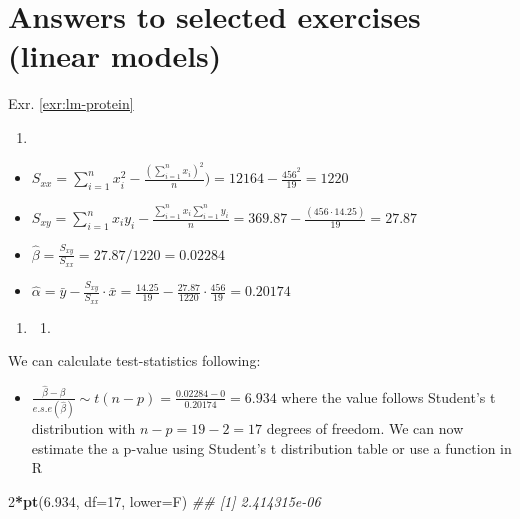 \documentclass[
]{book}
\newenvironment{Shaded}{\begin{snugshade}}{\end{snugshade}}
\newcommand{\CommentTok}[1]{\textcolor[rgb]{0.56,0.35,0.01}{\textit{#1}}}
\newcommand{\DataTypeTok}[1]{\textcolor[rgb]{0.13,0.29,0.53}{#1}}
\newcommand{\DecValTok}[1]{\textcolor[rgb]{0.00,0.00,0.81}{#1}}
\newcommand{\FloatTok}[1]{\textcolor[rgb]{0.00,0.00,0.81}{#1}}
\newcommand{\KeywordTok}[1]{\textcolor[rgb]{0.13,0.29,0.53}{\textbf{#1}}}
\newcommand{\NormalTok}[1]{#1}
\newcommand{\OperatorTok}[1]{\textcolor[rgb]{0.81,0.36,0.00}{\textbf{#1}}}
\providecommand{\tightlist}{%
  \setlength{\itemsep}{0pt}\setlength{\parskip}{0pt}}
\theoremstyle{definition}
\theoremstyle{definition}
\theoremstyle{definition}
\theoremstyle{remark}
\begin{document}
\hypertarget{answers-to-selected-exercises-linear-models}{%
\section*{Answers to selected exercises (linear models)}\label{answers-to-selected-exercises-linear-models}}

Exr. \ref{exr:lm-protein}

\begin{enumerate}
\def\labelenumi{\alph{enumi})}
\tightlist
\item
\end{enumerate}

\begin{itemize}
\tightlist
\item
  \(S_{xx} = \sum_{i=1}^{n}x_i^2-\frac{(\sum_{i=1}^{n}x_i)^2}{n}) = 12164 - \frac{456^2}{19} = 1220\)
\item
  \(S_{xy} = \sum_{i=1}^nx_iy_i-\frac{\sum_{i=1}^{n}x_i\sum_{i=1}^{n}y_i}{n} = 369.87 - \frac{(456 \cdot 14.25)}{19} = 27.87\)
\item
  \(\hat{\beta} = \frac{S_{xy}}{S_{xx}} = 27.87 / 1220 = 0.02284\)
\item
  \(\hat{\alpha} = \bar{y}-\frac{S_{xy}}{S_{xx}}\cdot \bar{x} = \frac{14.25}{19}-\frac{27.87}{1220}\cdot \frac{456}{19} = 0.20174\)
\end{itemize}

\begin{enumerate}
\def\labelenumi{\alph{enumi})}
\setcounter{enumi}{1}
\item
  \begin{enumerate}
  \def\labelenumii{\roman{enumii}.}
  \tightlist
  \item
  \end{enumerate}
\end{enumerate}

We can calculate test-statistics following:

\begin{itemize}
\tightlist
\item
  \(\frac{\hat{\beta} - \beta}{e.s.e(\hat{\beta})} \sim t(n-p) = \frac{0.02284 - 0}{0.20174} = 6.934\) where the value follows Student's t distribution with \(n-p = 19 - 2 = 17\) degrees of freedom. We can now estimate the a p-value using Student's t distribution table or use a function in R
\end{itemize}

\begin{Shaded}
\begin{Highlighting}[]
\DecValTok{2}\OperatorTok{*}\KeywordTok{pt}\NormalTok{(}\FloatTok{6.934}\NormalTok{, }\DataTypeTok{df=}\DecValTok{17}\NormalTok{, }\DataTypeTok{lower=}\NormalTok{F)}
\CommentTok{\#\# [1] 2.414315e{-}06}
\end{Highlighting}
\end{Shaded}
\end{document}
